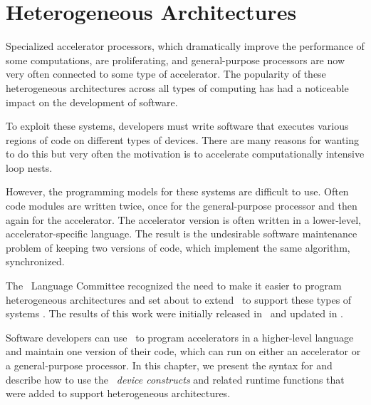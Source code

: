 \chapter{Heterogeneous Architectures}
\label{chap:heterogeneous_architectures}

Specialized accelerator processors, which dramatically improve the performance
of some computations, are proliferating, and general-purpose processors are
now very often connected to some type of accelerator.  
The popularity of these heterogeneous architectures across all types of
computing has had a noticeable impact on the development of software.  

To exploit these systems, developers must write software that executes various
regions of code on different types of devices.  There are many reasons for
wanting to do this but very often the motivation is to accelerate
computationally intensive loop nests.  

However, the programming models for these systems are difficult to use.
Often code modules are written twice, once for the general-purpose
processor and then again for the accelerator.  The accelerator version is often
written in a lower-level, accelerator-specific language.  The result is the
undesirable software maintenance problem of keeping two versions of code, which
implement the same algorithm, synchronized.

The \OMP\ Language Committee recognized the need to make it easier to program
heterogeneous architectures and set about to extend \OMP\ to support these types
of systems \cite{Beyer2011}.  The results of this work were initially released
in \OMPfourzero\ and updated in \OMPfourfive.

Software developers can use \OMP\ to program accelerators in a higher-level
language and maintain one version of their code, which can run on either an
accelerator or a general-purpose processor.  In this chapter, we present the
syntax for and describe how to use the \OMP\ \emph{device constructs} and
related runtime functions that were added to support heterogeneous
architectures.  



